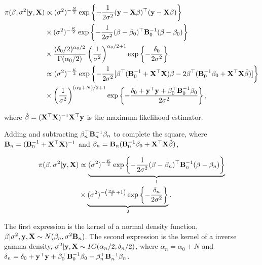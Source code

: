 \begin{align*}
	\pi(\beta,\sigma^2|\mathbf{y},\mathbf{X})&\propto (\sigma^2)^{-\frac{N}{2}} \exp \left\{-\frac{1}{2\sigma^2} ({\bf{y}} - {\bf{X}}\beta)^{\top}({\bf{y}} - {\bf{X}}\beta) \right\} \\
	& \times (\sigma^2)^{-\frac{K}{2}} \exp \left\{-\frac{1}{2\sigma^2} (\beta - \beta_0)^{\top}{\bf{B}}_0^{-1}(\beta - \beta_0)\right\} \\
	& \times \frac{(\delta_0/2)^{\alpha_0/2}}{\Gamma(\alpha_0/2)}\left(\frac{1}{\sigma^2}\right)^{\alpha_0/2+1}\exp \left\{-\frac{\delta_0}{2\sigma^2} \right\} \\
	& \propto (\sigma^2)^{-\frac{K}{2}} \exp \left\{-\frac{1}{2\sigma^2} [\beta^{\top}({\bf{B}}_0^{-1} + {\bf{X}}^{\top}{\bf{X}})\beta - 2\beta^{\top}({\bf{B}}_0^{-1}\beta_0 + {\bf{X}}^{\top}{\bf{X}}\hat{\beta})] \right\} \\
	& \times \left(\frac{1}{\sigma^2}\right)^{(\alpha_0+N)/2+1}\exp \left\{-\frac{\delta_0+ {\bf{y}}^{\top}{\bf{y}} + \beta_0^{\top}{\bf{B}}_0^{-1}\beta_0}{2\sigma^2} \right\},
\end{align*}

where $\hat{\beta}=({\bf{X}}^{\top}{\bf{X}})^{-1}{\bf{X}}^{\top}{\bf{y}}$ is the maximum likelihood estimator.

Adding and subtracting $\beta_n^{\top}{{\bf{B}}}_n^{-1} \beta_n$ to complete the square, where ${{\bf{B}}}_n = ({\bf{B}}_0^{-1} + {\bf{X}}^{\top}{\bf{X}})^{-1}$ and $\beta_n = {{\bf{B}}}_n({\bf{B}}_0^{-1}\beta_0 + {\bf{X}}^{\top}{\bf{X}}\hat{\beta})$,

\begin{align*}
	\pi(\beta,\sigma^2|\mathbf{y},\mathbf{X})&\propto \underbrace{(\sigma^2)^{-\frac{K}{2}} \exp \left\{-\frac{1}{2\sigma^2} (\beta-\beta_n)^{\top}{\bf{B}}^{-1}_n(\beta-\beta_n) \right\}}_1 \\
	& \times \underbrace{(\sigma^2)^{-\left(\frac{\alpha_n}{2}+1 \right)} \exp \left\{-\frac{\delta_n}{2\sigma^2} \right\}}_2.
\end{align*}

The first expression is the kernel of a normal density function, $\beta|\sigma^2, {\bf{y}}, {\bf{X}} \sim N(\beta_n, \sigma^2{\bf{B}}_n)$. The second expression is the kernel of a inverse gamma density,	$\sigma^2| {\bf{y}}, {\bf{X}}\sim IG(\alpha_n/2, \delta_n/2)$, where $\alpha_n = \alpha_0 + N$ and $\delta_n = \delta_0 + {\bf{y}}^{\top}{\bf{y}} + \beta_0^{\top}{\bf{B}}_0^{-1}\beta_0 - \beta_n^{\top}{\bf{B}}_n^{-1}\beta_n$.

